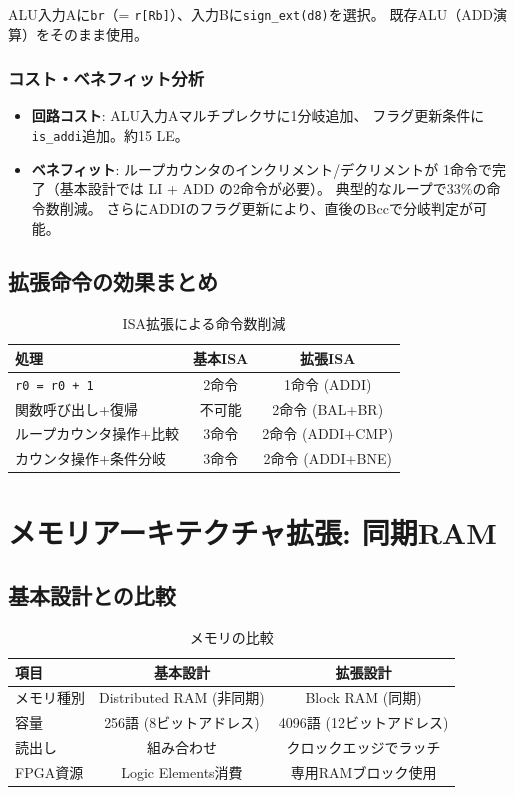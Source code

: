 \documentclass[a4paper,11pt]{ltjsarticle}
\begin{document}
ALU入力Aに\texttt{br}（= \texttt{r[Rb]}）、入力Bに\texttt{sign\_ext(d8)}を選択。
既存ALU（ADD演算）をそのまま使用。

\subsubsection{コスト・ベネフィット分析}

\begin{itemize}
\item \textbf{回路コスト}: ALU入力Aマルチプレクサに1分岐追加、
  フラグ更新条件に\texttt{is\_addi}追加。約15 LE。
\item \textbf{ベネフィット}: ループカウンタのインクリメント/デクリメントが
  1命令で完了（基本設計では LI + ADD の2命令が必要）。
  典型的なループで33\%の命令数削減。
  さらにADDIのフラグ更新により、直後のBccで分岐判定が可能。
\end{itemize}

\subsection{拡張命令の効果まとめ}

\begin{table}[h]
\centering
\caption{ISA拡張による命令数削減}
\begin{tabular}{lcc}
\toprule
処理 & 基本ISA & 拡張ISA \\
\midrule
\texttt{r0 = r0 + 1} & 2命令 & 1命令 (ADDI) \\
関数呼び出し+復帰 & 不可能 & 2命令 (BAL+BR) \\
ループカウンタ操作+比較 & 3命令 & 2命令 (ADDI+CMP) \\
カウンタ操作+条件分岐 & 3命令 & 2命令 (ADDI+BNE) \\
\bottomrule
\end{tabular}
\end{table}


\section{メモリアーキテクチャ拡張: 同期RAM}

\subsection{基本設計との比較}

\begin{table}[h]
\centering
\caption{メモリの比較}
\begin{tabular}{lcc}
\toprule
項目 & 基本設計 & 拡張設計 \\
\midrule
メモリ種別 & Distributed RAM (非同期) & Block RAM (同期) \\
容量       & 256語 (8ビットアドレス) & 4096語 (12ビットアドレス) \\
読出し     & 組み合わせ & クロックエッジでラッチ \\
FPGA資源   & Logic Elements消費 & 専用RAMブロック使用 \\
\bottomrule
\end{tabular}
\end{table}
\end{document}
